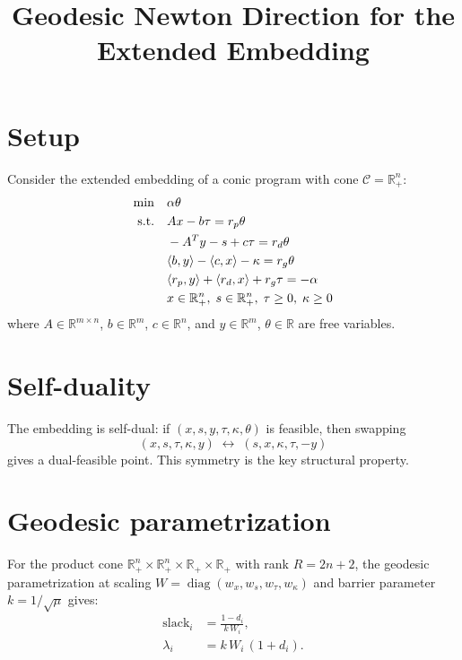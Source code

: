 \documentclass{article}
\title{Geodesic Newton Direction for the Extended Embedding}
\author{}
\date{}
\newcommand{\R}{\mathbb{R}}
\newcommand{\ip}[2]{\langle #1, #2 \rangle}
\newcommand{\diag}{\operatorname{diag}}
\begin{document}
\maketitle

\section{Setup}

Consider the extended embedding of a conic program with cone $\mathcal{C} = \R^n_+$:
\begin{align}
  \min \quad & \alpha \theta \notag \\
  \text{s.t.} \quad & Ax - b\tau = r_p \theta \label{eq:primal} \\
  & -A^T y - s + c\tau = r_d \theta \label{eq:dual} \\
  & \ip{b}{y} - \ip{c}{x} - \kappa = r_g \theta \label{eq:gap} \\
  & \ip{r_p}{y} + \ip{r_d}{x} + r_g \tau = -\alpha \label{eq:norm} \\
  & x \in \R^n_+, \; s \in \R^n_+, \; \tau \geq 0, \; \kappa \geq 0 \notag
\end{align}
where $A \in \R^{m \times n}$, $b \in \R^m$, $c \in \R^n$, and $y \in \R^m$, $\theta \in \R$ are free variables.

\section{Self-duality}

The embedding is self-dual: if $(x, s, y, \tau, \kappa, \theta)$ is feasible, then swapping
\[
  (x, s, \tau, \kappa, y) \;\longleftrightarrow\; (s, x, \kappa, \tau, -y)
\]
gives a dual-feasible point. This symmetry is the key structural property.

\section{Geodesic parametrization}

For the product cone $\R^n_+ \times \R^n_+ \times \R_+ \times \R_+$ with rank $R = 2n + 2$, the geodesic parametrization at scaling $W = \diag(w_x, w_s, w_\tau, w_\kappa)$ and barrier parameter $k = 1/\sqrt{\mu}$ gives:
\begin{align}
  \text{slack}_i &= \frac{1 - d_i}{k \, W_i}, \label{eq:slack} \\
  \lambda_i &= k \, W_i \, (1 + d_i). \label{eq:dual_var}
\end{align}
\end{document}
